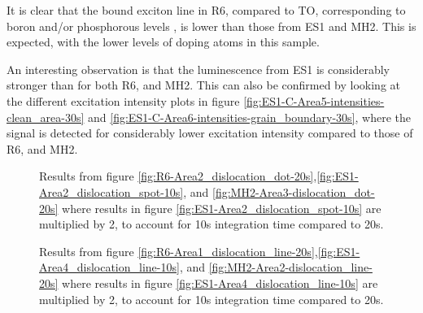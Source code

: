 It is clear that the bound exciton line in R6, compared to TO, corresponding to boron and/or phosphorous levels \cite{tajima78}, is lower than those from ES1 and MH2. This is expected, with the lower levels of doping atoms in this sample.

An interesting observation is that the luminescence from ES1 is considerably stronger than for both R6, and MH2. This can also be confirmed by looking at the different excitation intensity plots in figure \ref{fig:ES1-C-Area5-intensities-clean_area-30s} and \ref{fig:ES1-C-Area6-intensities-grain_boundary-30s}, where the signal is detected for considerably lower excitation intensity compared to those of R6, and MH2. %




\begin{figure}[H]
\centering

\caption[Comparisons in a dislocation dot]{Results from figure \ref{fig:R6-Area2_dislocation_dot-20s},\ref{fig:ES1-Area2_dislocation_spot-10s}, and \ref{fig:MH2-Area3-dislocation_dot-20s} where results in figure \ref{fig:ES1-Area2_dislocation_spot-10s} are multiplied by 2, to account for 10s integration time compared to 20s. }

\label{fig:comparisons_in_a_dislocation_dot}
\end{figure}




\begin{figure}[H]
\centering
{}

\caption[Comparisons in a dislocation line]{Results from figure \ref{fig:R6-Area1_dislocation_line-20s},\ref{fig:ES1-Area4_dislocation_line-10s}, and \ref{fig:MH2-Area2-dislocation_line-20s} where results in figure \ref{fig:ES1-Area4_dislocation_line-10s} are multiplied by 2, to account for 10s integration time compared to 20s. }
\label{fig:comparisons_of_a_dislocation_line}
\end{figure}




